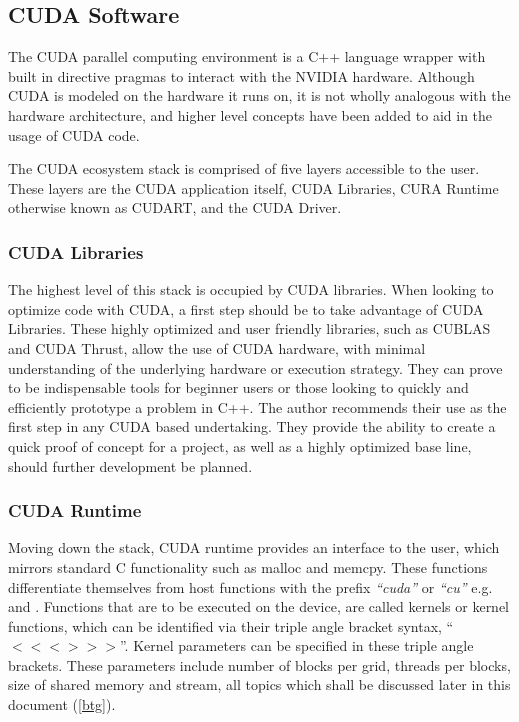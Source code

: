 \subsection{CUDA Software}

The CUDA parallel computing environment is a C++ language wrapper with built in
\gls{directive pragmas} to interact with the NVIDIA hardware.  Although CUDA is modeled on the
hardware it runs on, it is not wholly analogous with the hardware architecture,
and higher level concepts have been added to aid in the usage of CUDA code.
\par
The CUDA ecosystem stack is comprised of five layers accessible to the user.
These layers are the CUDA application itself, CUDA Libraries, CURA Runtime otherwise
known as CUDART, and the CUDA Driver.


\subsubsection{CUDA Libraries}

The highest level of this stack is occupied
by CUDA libraries. When looking to optimize code with CUDA, a
first step should be to take advantage of CUDA Libraries.  These highly optimized
and user friendly libraries, such as CUBLAS and CUDA Thrust, allow the use of
CUDA hardware, with minimal understanding of the underlying hardware or execution strategy.
They can prove to be indispensable tools for beginner users or those looking to quickly and
efficiently prototype a problem in C++. The author recommends their use as the first step
in any CUDA based undertaking. They provide the ability to create a quick proof
of concept for a project, as well as a highly optimized base line, should further
development be planned.
\subsubsection{CUDA Runtime}

Moving down the stack, CUDA runtime provides an interface to the user, which mirrors
standard C functionality such as malloc and memcpy.  These functions differentiate
themselves from host functions with the prefix \textit{``cuda''} or \textit{``cu''}
e.g.  and .  Functions that are to be executed on the
device, are called kernels or kernel functions, which can be identified
 via their triple angle bracket syntax, ``$<<< >>>$''.
Kernel parameters can be specified in these triple angle brackets.  These parameters
include number of blocks per grid, threads per blocks, size of shared memory and
stream, all topics which shall be discussed later in this document (\ref{btg}).

